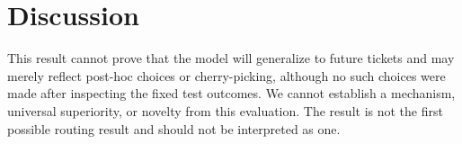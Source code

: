 \section{Discussion}

This result cannot prove that the model will generalize to future tickets and
may merely reflect post-hoc choices or cherry-picking, although no such choices
were made after inspecting the fixed test outcomes. We cannot establish a
mechanism, universal superiority, or novelty from this evaluation. The result
is not the first possible routing result and should not be interpreted as one.

